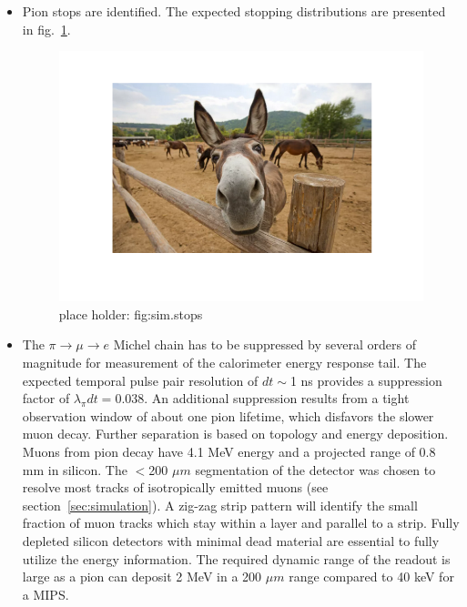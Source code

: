 \begin{itemize} 
\item 
Pion stops are identified. The expected stopping distributions are presented in fig.~\ref{fig:sim.stops}.
\begin{figure}[h!]
\centering
\includegraphics[scale=0.4]{sections/figures/ph.png}
\caption{place holder: fig:sim.stops}
\label{fig:sim.stops}
\end{figure}

\item
The $\pi \rightarrow \mu \rightarrow e$ Michel chain has to be suppressed by several orders of magnitude for measurement of the calorimeter energy response tail. The expected temporal pulse pair resolution of $dt\sim$1 ns provides a suppression factor of $\lambda_\pi dt=0.038$. An additional suppression results from a tight observation window of 
about one
pion lifetime, which disfavors the slower muon decay. Further separation is based on topology and energy 
deposition. Muons from pion decay have 4.1 MeV energy and a projected range of 0.8 mm in silicon. The $<$200 $\mu m$ segmentation of the detector was
chosen to resolve most tracks of isotropically emitted muons (see section~\ref{sec:simulation}). A zig-zag strip pattern will identify
the small fraction of muon tracks which stay within a layer and parallel to a strip. Fully depleted silicon detectors with minimal dead material
are essential to fully utilize the energy information. The required dynamic range of the readout is large as a pion can deposit 2 MeV in a
200 $\mu m$ range compared to 40 keV for a MIPS. 


\end{itemize}
